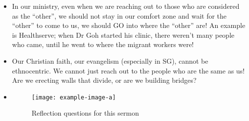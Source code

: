 \begin{itemize}
{  Corinthians 10:17, ``Because there is one bread, we who are many are one
  body, for we all partake of the one bread.''). }
  \item{In our ministry, even when we are reaching out to those who are
  considered as the ``other'', we should not stay in our comfort zone and
  wait for the ``other'' to come to us, we should GO into where the ``other''
  are! An example is Healthserve; when Dr Goh started his clinic, there
  weren't many people who came, until he went to where the migrant workers
  were!}
  \item{Our Christian faith, our evangelism (especially in SG), cannot be
  ethnocentric. We cannot just reach out to the people who are the same as
  us! Are we erecting walls that divide, or are we building bridges?}
  \item{\begin{figure}[H]
    \centering
    \texttt{[image: example-image-a]}
    \caption[]{Reflection questions for this sermon}
    \label{}
  \end{figure}}
\end{itemize}